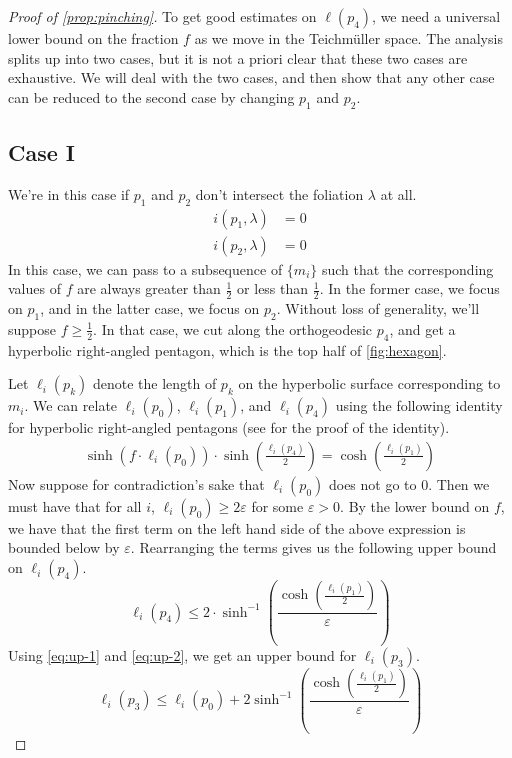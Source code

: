 \documentclass[12pt, reqno]{amsart}
\begin{document}
\begin{proof}[Proof of \autoref{prop:pinching}]
 To get good estimates on $\ell(p_4)$, we need a universal lower bound on the fraction $f$ as we move in the Teichm\"uller space.
 The analysis splits up into two cases, but it is not {a priori} clear that these two cases are exhaustive.
 We will deal with the two cases, and then show that any other case can be reduced to the second case by changing $p_1$ and $p_2$.

\subsection*{Case I}
\label{case1}
We're in this case if $p_1$ and $p_2$ don't intersect the foliation $\lambda$ at all.
\begin{align*}
  i(p_1, \lambda) &= 0 \\
  i(p_2, \lambda) &= 0
\end{align*}
In this case, we can pass to a subsequence of $\{m_i\}$ such that the corresponding values of $f$ are always greater than $\frac{1}{2}$ or less than $\frac{1}{2}$.
In the former case, we focus on $p_1$, and in the latter case, we focus on $p_2$.
Without loss of generality, we'll suppose $f \geq \frac{1}{2}$.
In that case, we cut along the orthogeodesic $p_4$, and get a hyperbolic right-angled pentagon, which is the top half of \autoref{fig:hexagon}.

Let $\ell_i(p_k)$ denote the length of $p_k$ on the hyperbolic surface corresponding to $m_i$.
We can relate $\ell_i(p_0)$, $\ell_i(p_1)$, and $\ell_i(p_4)$ using the following identity for hyperbolic right-angled pentagons (see \cite{thurston1979geometry} for the proof of the identity).
\begin{align}
  \label{eq:pentagon}
  \sinh\left( f \cdot \ell_i(p_0) \right)  \cdot \sinh\left( \frac{\ell_i(p_4)}{2} \right)  = \cosh\left( \frac{\ell_i(p_1)}{2} \right)
\end{align}
Now suppose for contradiction's sake that $\ell_i(p_0)$ does not go to $0$.
Then we must have that for all $i$, $\ell_i(p_0) \geq 2\varepsilon$ for some $\varepsilon > 0$. By the lower bound on $f$, we have that the first term on the left hand side of the above expression is bounded below by $\varepsilon$.
Rearranging the terms gives us the following upper bound on $\ell_i(p_4)$.
\begin{equation}
  \label{eq:up-2}
  \ell_i(p_4) \leq 2 \cdot \sinh^{-1} \left( \frac{\cosh \left( \frac{\ell_i(p_1)}{2} \right)}{\varepsilon} \right)
\end{equation}
Using \eqref{eq:up-1} and \eqref{eq:up-2}, we get an upper bound for $\ell_i(p_3)$.
\begin{equation}
  \label{eq:up-3}
  \ell_i(p_3) \leq \ell_i(p_0) +
  2 \sinh^{-1} \left( \frac{\cosh \left( \frac{\ell_i(p_1)}{2} \right)}{\varepsilon} \right)
\end{equation}


\end{proof}
\end{document}
